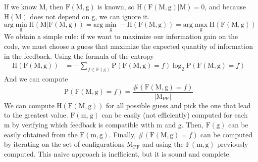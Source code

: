\documentclass{article}
\begin{document}
If we know M, then $\mbox{F}(\mbox{M},\mbox{g})$ is known, so
$\mbox{H}(\mbox{F}(\mbox{M},\mbox{g})|\mbox{M}) = 0$, and because $\mbox{H}(\mbox{M})$ does not depend on g, we can ignore it.
$$
\mbox{arg}\min_{\mbox{g}}\mbox{H}(\mbox{M}|\mbox{F}(\mbox{M},\mbox{g})) = \mbox{arg}\min_{\mbox{g}}-\mbox{H}(\mbox{F}(\mbox{M},\mbox{g})) = \mbox{arg}\max_{\mbox{g}}\mbox{H}(\mbox{F}(\mbox{M},\mbox{g}))
$$
We obtain a simple rule: if we want to maximize our information gain on the code, we must choose a guess that maximize the expected quantity of information in the feedback. Using the formula of the entropy
\begin{align*}
    \mbox{H}(\mbox{F}(\mbox{M},\mbox{g})) &= -\sum_{f\in\mbox{F}(\mbox{g})} \mbox{P}(\mbox{F}(\mbox{M},\mbox{g}) = f) \log_2\mbox{P}(\mbox{F}(\mbox{M},\mbox{g}) = f)
\end{align*}
And we can compute 
$$\mbox{P}(\mbox{F}(\mbox{M},\mbox{g}) = f) = \frac{\#(\mbox{F}(\mbox{M},\mbox{g}) = f)}{\left|\mbox{M}_{\mbox{PF}}\right|}
$$
We can compute $\mbox{H}(\mbox{F}(\mbox{M},\mbox{g}))$ for all possible guess and pick the one that lead to the greatest value. $\mbox{F}(\mbox{m},\mbox{g})$ can be easily (not efficiently) computed for each m by verifying which feedback is compatible with m and g. Then, $\mbox{F}(\mbox{g})$ can be easily obtained from the $\mbox{F}(\mbox{m},\mbox{g})$. Finally, $\#(\mbox{F}(\mbox{M},\mbox{g}) = f)$ can be computed by iterating on the set of configurations $\mbox{M}_{\mbox{PF}}$ and using the $\mbox{F}(\mbox{m},\mbox{g})$ previously computed. This naive approach is inefficient, but it is sound and complete.
\end{document}
